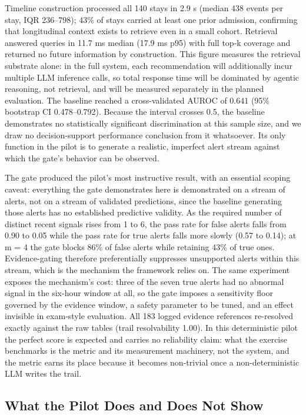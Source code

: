 Timeline construction processed all 140 stays in 2.9 s (median 438 events per stay,
IQR 236--798); 43\% of stays carried at least one prior admission, confirming that longitudinal
context exists to retrieve even in a small cohort. Retrieval answered queries in 11.7 ms
median (17.9 ms p95) with full top-k coverage and returned no future information by
construction. This figure measures the retrieval substrate alone: in the full system, each
recommendation will additionally incur multiple LLM inference calls, so total response time
will be dominated by agentic reasoning, not retrieval, and will be measured separately in
the planned evaluation. The baseline reached a cross-validated AUROC of 0.641 (95\% bootstrap CI
0.478--0.792). Because the interval crosses 0.5, the baseline demonstrates no statistically
significant discrimination at this sample size, and we draw no decision-support performance
conclusion from it whatsoever. Its only function in the pilot is to generate a realistic,
imperfect alert stream against which the gate's behavior can be observed.

The gate produced the pilot's most instructive result, with an essential scoping caveat:
everything the gate demonstrates here is demonstrated on a stream of alerts, not on a stream
of validated predictions, since the baseline generating those alerts has no established
predictive validity. As the required number of distinct
recent signals rises from 1 to 6, the pass rate for false alerts falls from 0.90 to 0.05
while the pass rate for true alerts falls more slowly (0.57 to 0.14); at m = 4 the gate
blocks 86\% of false alerts while retaining 43\% of true ones. Evidence-gating therefore
preferentially suppresses unsupported alerts within this stream, which is the mechanism the
framework relies on.
The same experiment exposes the mechanism's cost: three of the seven true alerts had no
abnormal signal in the six-hour window at all, so the gate imposes a sensitivity floor
governed by the evidence window, a safety parameter to be tuned, and an effect invisible in
exam-style evaluation. All 183 logged evidence references re-resolved exactly against the raw
tables (trail resolvability 1.00). In this deterministic pilot the perfect score is expected
and carries no reliability claim: what the exercise benchmarks is the metric and its
measurement machinery, not the system, and the metric earns its place because it becomes
non-trivial once a non-deterministic LLM writes the trail.

\subsection{What the Pilot Does and Does Not Show}


